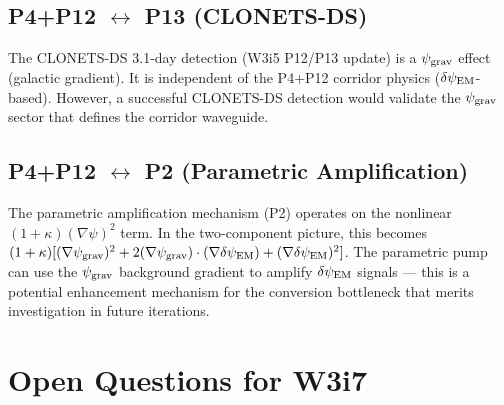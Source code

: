 \documentclass[11pt]{article}
\newcommand{\psigrav}{\psi_{\rm grav}}
\newcommand{\dpsiEM}{\delta\psi_{\rm EM}}
\begin{document}
\subsection{P4+P12 $\leftrightarrow$ P13 (CLONETS-DS)}

The CLONETS-DS 3.1-day detection (W3i5 P12/P13 update) is a $\psigrav$
effect (galactic gradient). It is independent of the P4+P12 corridor
physics ($\dpsiEM$-based). However, a successful CLONETS-DS detection
would validate the $\psigrav$ sector that defines the corridor waveguide.

\subsection{P4+P12 $\leftrightarrow$ P2 (Parametric Amplification)}

The parametric amplification mechanism (P2) operates on the nonlinear
$(1+\kappa)(\nabla\psi)^2$ term. In the two-component picture, this
becomes $(1+\kappa)[(\nabla\psigrav)^2 + 2(\nabla\psigrav)\cdot
(\nabla\dpsiEM) + (\nabla\dpsiEM)^2]$. The parametric pump can use
the $\psigrav$ background gradient to amplify $\dpsiEM$ signals ---
this is a potential enhancement mechanism for the conversion bottleneck
that merits investigation in future iterations.

\section{Open Questions for W3i7}
\label{sec:open}
\end{document}

